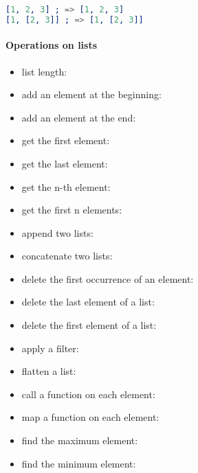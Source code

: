 \documentclass[a4paper,landscape,10pt]{article}
\begin{document}
\begin{multicols*}{2}
  \begin{lstlisting}[language=Erlang]
[1, 2, 3] ; => [1, 2, 3]
[1, [2, 3]] ; => [1, [2, 3]]
\end{lstlisting}

  \breakcolumn

  \paragraph{Operations on lists}

  \begin{itemize}
    \item list length: 
    \item add an element at the beginning: 
    \item add an element at the end: 
    \item get the first element: 
    \item get the last element: 
    \item get the n-th element: 
    \item get the first n elements: 
    \item append two lists: 
    \item concatenate two lists: 
    \item delete the first occurrence of an element: 
    \item delete the last element of a list: 
    \item delete the first element of a list: 
    \item apply a filter: 
    \item flatten a list: 

    \item call a function on each element: 
    \item map a function on each element: 
    \item find the maximum element: 
    \item find the minimum element: 
  \end{itemize}


\end{multicols*}
\end{document}
